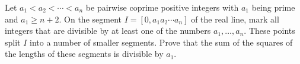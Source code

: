 Let $a_1 < a_2 < \cdots < a_n$ be pairwise coprime positive integers with $a_1$ being prime and $a_1 \geq n + 2$. On the segment $I = [0, a_1 a_2 \cdots a_n]$ of the real line, mark all integers that are divisible by at least one of the numbers $a_1, \ldots, a_n$. These points split $I$ into a number of smaller segments. Prove that the sum of the squares of the lengths of these segments is divisible by $a_1$.
